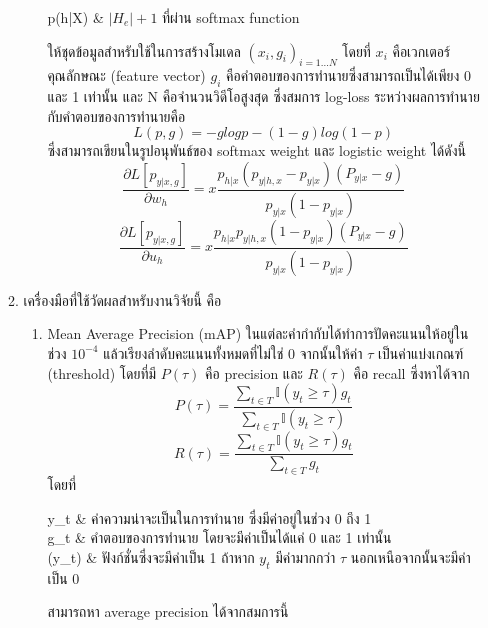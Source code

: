 \begin{enumerate}
\begin{enumerate}
\begin{enumerate}
\begin{conditions}
					p(h|X) & $|H_e| + 1$ ที่ผ่าน softmax function
				\end{conditions}
				ให้ชุดข้อมูลสำหรับใช้ในการสร้างโมเดล $(x_i, g_i)_{i=1...N} $ โดยที่ $x_i$ คือเวกเตอร์คุณลักษณะ (feature vector) $g_i$ คือคำตอบของการทำนายซึ่งสามารถเป็นได้เพียง 0 และ 1 เท่านั้น 
				และ N คือจำนวนวิดีโอสูงสุด ซึ่งสมการ log-loss ระหว่างผลการทำนายกับคำตอบของการทำนายคือ
				\begin{equation}
					L(p,g)=-glogp-(1-g)log(1-p)
				\end{equation}
				ซึ่งสามารถเขียนในรูปอนุพันธ์ของ softmax weight และ logistic weight ได้ดังนี้
				\begin{equation}
					\frac{\partial L[p_{y|x,g}]}{\partial w_h} = x \frac{p_{h|x}(p_{y|h,x}-p_{y|x})(P_{y|x}-g)}{p_{y|x}(1-p_{y|x})}
				\end{equation}
				\begin{equation}
					\frac{\partial L[p_{y|x,g}]}{\partial u_h} = x \frac{p_{h|x}p_{y|h,x}(1-p_{y|x})(P_{y|x}-g)}{p_{y|x}(1-p_{y|x})}
				\end{equation}
			\end{enumerate}
		\item เครื่องมือที่ใช้วัดผลสำหรับงานวิจัยนี้ คือ
			\begin{enumerate}
				\setlength\itemsep{-0.25em}
				\item Mean Average Precision (mAP)
				ในแต่ละคำกำกับได้ทำการปัดคะแนนให้อยู่ในช่วง $10^{-4}$ แล้วเรียงลำดับคะแนนทั้งหมดที่ไม่ใช่ 0 จากนั้นให้ค่า $\tau$ เป็นค่าแบ่งเกณฑ์ (threshold)
				โดยที่มี $P(\tau)$ คือ precision และ $R(\tau)$ คือ recall ซึ่งหาได้จาก
				\begin{equation}
					P(\tau) = \frac{\sum_{t \in T}\mathbb{I}(y_t\geq \tau )g_t}{\sum_{t \in T}\mathbb{I}(y_t\geq \tau )}
				\end{equation}
				\begin{equation}
					R(\tau) = \frac{\sum_{t \in T}\mathbb{I}(y_t\geq \tau )g_t}{\sum_{t \in T}g_t}
				\end{equation}
				โดยที่
				\begin{conditions}
					y_t & ค่าความน่าจะเป็นในการทำนาย ซึ่งมีค่าอยู่ในช่วง 0 ถึง 1 \\
					g_t & คำตอบของการทำนาย โดยจะมีค่าเป็นได้แค่ 0 และ 1 เท่านั้น\\
					(y_t\geq \tau) & ฟังก์ชั่นซึ่งจะมีค่าเป็น 1 ถ้าหาก $y_t$ มีค่ามากกว่า $\tau$ นอกเหนือจากนั้นจะมีค่าเป็น 0
				\end{conditions}
				สามารถหา average precision ได้จากสมการนี้ 
				\begin{equation}

\end{equation}
\end{enumerate}
\end{enumerate}
\end{enumerate}
